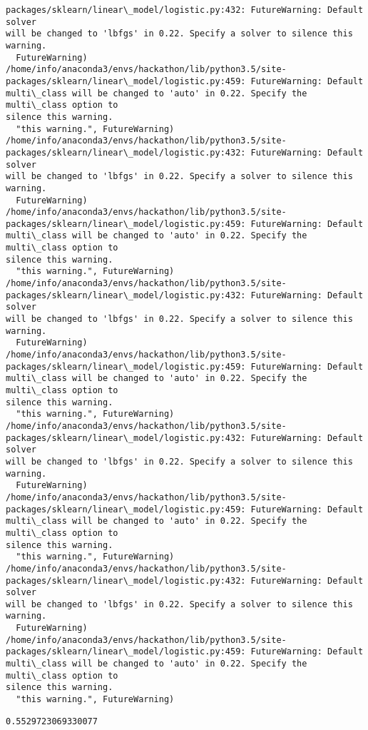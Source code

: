 \documentclass[11pt]{article}
\newcommand{\prompt}[4]{
        \llap{{\color{#2}[#3]: #4}}\vspace{-1.25em}
    }
\begin{document}
\begin{Verbatim}[commandchars=\\\{\}]
packages/sklearn/linear\_model/logistic.py:432: FutureWarning: Default solver
will be changed to 'lbfgs' in 0.22. Specify a solver to silence this warning.
  FutureWarning)
/home/info/anaconda3/envs/hackathon/lib/python3.5/site-
packages/sklearn/linear\_model/logistic.py:459: FutureWarning: Default
multi\_class will be changed to 'auto' in 0.22. Specify the multi\_class option to
silence this warning.
  "this warning.", FutureWarning)
/home/info/anaconda3/envs/hackathon/lib/python3.5/site-
packages/sklearn/linear\_model/logistic.py:432: FutureWarning: Default solver
will be changed to 'lbfgs' in 0.22. Specify a solver to silence this warning.
  FutureWarning)
/home/info/anaconda3/envs/hackathon/lib/python3.5/site-
packages/sklearn/linear\_model/logistic.py:459: FutureWarning: Default
multi\_class will be changed to 'auto' in 0.22. Specify the multi\_class option to
silence this warning.
  "this warning.", FutureWarning)
/home/info/anaconda3/envs/hackathon/lib/python3.5/site-
packages/sklearn/linear\_model/logistic.py:432: FutureWarning: Default solver
will be changed to 'lbfgs' in 0.22. Specify a solver to silence this warning.
  FutureWarning)
/home/info/anaconda3/envs/hackathon/lib/python3.5/site-
packages/sklearn/linear\_model/logistic.py:459: FutureWarning: Default
multi\_class will be changed to 'auto' in 0.22. Specify the multi\_class option to
silence this warning.
  "this warning.", FutureWarning)
/home/info/anaconda3/envs/hackathon/lib/python3.5/site-
packages/sklearn/linear\_model/logistic.py:432: FutureWarning: Default solver
will be changed to 'lbfgs' in 0.22. Specify a solver to silence this warning.
  FutureWarning)
/home/info/anaconda3/envs/hackathon/lib/python3.5/site-
packages/sklearn/linear\_model/logistic.py:459: FutureWarning: Default
multi\_class will be changed to 'auto' in 0.22. Specify the multi\_class option to
silence this warning.
  "this warning.", FutureWarning)
/home/info/anaconda3/envs/hackathon/lib/python3.5/site-
packages/sklearn/linear\_model/logistic.py:432: FutureWarning: Default solver
will be changed to 'lbfgs' in 0.22. Specify a solver to silence this warning.
  FutureWarning)
/home/info/anaconda3/envs/hackathon/lib/python3.5/site-
packages/sklearn/linear\_model/logistic.py:459: FutureWarning: Default
multi\_class will be changed to 'auto' in 0.22. Specify the multi\_class option to
silence this warning.
  "this warning.", FutureWarning)
\end{Verbatim}

            \begin{tcolorbox}[breakable, boxrule=.5pt, size=fbox, pad at break*=1mm, opacityfill=0]
\prompt{Out}{outcolor}{176}{\hspace{3.5pt}}
\begin{Verbatim}[commandchars=\\\{\}]
0.5529723069330077
\end{Verbatim}
\end{tcolorbox}
        
\end{document}
